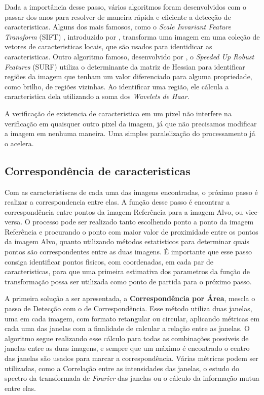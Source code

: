     Dada a importância desse passo, vários algoritmos foram desenvolvidos com o passar dos anos para resolver de maneira
rápida e eficiente a detecção de caracteristicas. Alguns dos mais famosos, como o 
\textit{Scale Invariant Feature Transform} (SIFT) , introduzido por \cite{lowe1999object}, transforma uma imagem em uma 
coleção de vetores de caracteristicas locais, que são usados para identidicar as caracteristicas. Outro algoritmo famoso,
desenvolvido por \cite{bay2006surf}, o \textit{Speeded Up Robust Features} (SURF) utiliza o determinante da matriz de
Hessian para identificar regiões da imagem que tenham um valor diferenciado para alguma propriedade, como brilho, de 
regiões vizinhas. Ao identificar uma região, ele cálcula a caracteristica dela utilizando a soma dos 
\textit{Wavelets de Haar}.

    A verificação de existencia de caracteristica em um pixel não interfere na verificação em quaisquer outro pixel da
imagem, já que não precisamos modificar a imagem em nenhuma maneira. Uma simples paralelização do processamento já o
acelera.

\subsection{Correspondência de caracteristicas}

    Com as caracteristiscas de cada uma das imagens encontradas, o próximo passo é realizar a correspondencia entre elas.
A função desse passo é encontrar a correspondência entre pontos da imagem Referência para a imagem Alvo, ou vice-versa. 
O processo pode ser realizado tanto escolhendo ponto a ponto da imagem Referência e procurando o ponto com maior valor 
de proximidade entre os pontos da imagem Alvo, quanto utilizando métodos estatisticos para determinar quais pontos são 
correspondentes entre as duas imagens. É importante que esse passo consiga identificar pontos fisicos, com coordenadas, 
em cada par de caracteristicas, para que uma primeira estimativa dos parametros da função de transformação possa ser 
utilizada como ponto de partida para o próximo passo.

    A primeira solução a ser apresentada, a \textbf{Correspondência por Área}, mescla o passo de Detecção com o de 
Correspondência. Esse método utiliza duas janelas, uma em cada imagem, com formato retangular ou circular, aplicando
métricas em cada uma das janelas com a finalidade de calcular a relação entre as janelas. O algoritmo segue realizando
esse cálculo para todas as combinações possiveis de janelas entre as duas imagens, e sempre que um máximo é encontrado
o centro das janelas são usados para marcar a correspondência. Várias métricas podem ser utilizadas, como a 
Correlação entre as intensidades das janelas, o estudo do spectro da transformada de \textit{Fourier} das janelas ou 
o cálculo da informação mutua entre elas.

